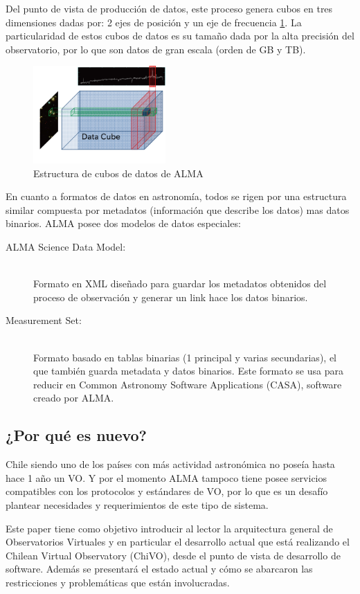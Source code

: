 Del punto de vista de producción de datos, este proceso genera cubos en tres
dimensiones dadas por: 2 ejes de posición y un eje de frecuencia
\ref{fig:cube}. La particularidad de estos cubos de datos es su tamaño dada por
la alta precisión del observatorio, por lo que son datos de gran escala (orden
de GB y TB).

\begin{figure}[ht]
    \centering
    \includegraphics[width=0.45\textwidth]{images/cube.png}
    \caption{Estructura de cubos de datos de ALMA \cite{dent20132}}
    \label{fig:cube}
\end{figure}

En cuanto a formatos de datos en astronomía, todos se rigen por una estructura
similar compuesta por metadatos (información que describe los datos) mas datos
binarios. ALMA posee dos modelos de datos especiales:
\begin{description}
    \item[ALMA Science Data Model:] \hfill \\
        Formato en XML diseñado para guardar los metadatos obtenidos del
        proceso de observación y generar un link hace los datos binarios.
    \item[Measurement Set:] \hfill \\
        Formato basado en tablas binarias (1 principal y varias secundarias),
        el que también guarda metadata y datos binarios. Este formato se usa
        para reducir en Common Astronomy Software Applications (CASA), software
        creado por ALMA.
\end{description}

\subsection{¿Por qué es nuevo?}
Chile siendo uno de los países con más actividad astronómica no poseía hasta
hace 1 año un VO. Y por el momento ALMA tampoco tiene posee servicios
compatibles con los protocolos y estándares de VO, por lo que es un desafío
plantear necesidades y requerimientos de este tipo de sistema.

Este paper tiene como objetivo introducir al lector la arquitectura general de
Observatorios Virtuales y en particular el desarrollo actual que está
realizando el Chilean Virtual Observatory (ChiVO), desde el punto de vista de
desarrollo de software. Además se presentará el estado actual y cómo se
abarcaron las restricciones y problemáticas que están involucradas.


